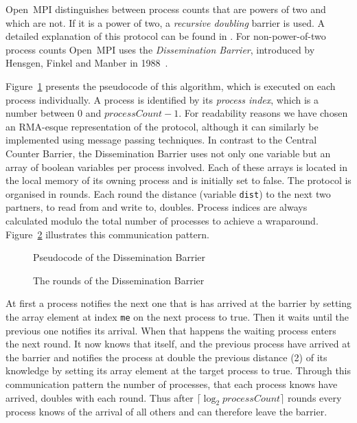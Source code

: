 \documentclass[a4paper, 10pt]{article}
\begin{document}
Open~MPI distinguishes between process counts that are powers of two and which are not. If it is a power of two, a \emph{recursive doubling} barrier is used. A detailed explanation of this protocol can be found in \cite{hoefler2005}. For non-power-of-two process counts Open~MPI uses the \emph{Dissemination Barrier}, introduced by Hensgen, Finkel and Manber in 1988~\cite{hensgen1988}.

Figure~\ref{fig:pseudocode-dissemination} presents the pseudocode of this algorithm, which is executed on each process individually. A process is identified by its \emph{process index}, which is a number between 0 and $\mathit{processCount} - 1$. For readability reasons we have chosen an RMA-esque representation of the protocol, although it can similarly be implemented using message passing techniques.
In contrast to the Central Counter Barrier, the Dissemination Barrier uses not only one variable but an array of boolean variables per process involved. Each of these arrays is located in the local memory of its owning process and is initially set to false.
The protocol is organised in rounds. Each round the distance (variable \texttt{dist}) to the next two partners, to read from and write to, doubles. Process indices  are always calculated modulo the total number of processes to achieve a wraparound. Figure~\ref{fig:diagram-dissemination} illustrates this communication pattern.

\begin{figure}[htbp]
	\centering
	
	\caption{Pseudocode of the Dissemination Barrier}
	\label{fig:pseudocode-dissemination}
\end{figure}

\begin{figure}[htbp]
	\centering
	
	\caption{The rounds of the Dissemination Barrier}
	\label{fig:diagram-dissemination}
\end{figure}

At first a process notifies the next one that is has arrived at the barrier by setting the array element at index \texttt{me} on the next process to true. Then it waits until the previous one notifies its arrival. When that happens the waiting process enters the next round. It now knows that itself, and the previous process have arrived at the barrier and notifies the process at double the previous distance (2) of its knowledge by setting its array element at the target process to true. Through this communication pattern the number of processes, that each process knows have arrived, doubles with each round. Thus after $\lceil \log_2 \mathit{processCount} \rceil$ rounds every process knows of the arrival of all others and can therefore leave the barrier.
\end{document}
